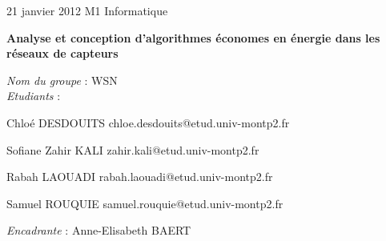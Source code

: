 \documentclass[a4paper]{article}
\begin{document}
\large
\setlength{\parskip}{6mm plus2mm minus2mm}
\setlength{\textwidth}{530pt}
\setlength{\parindent}{0cm}

21 janvier 2012 \hfill M1 Informatique


{\centering \Large \bfseries Analyse et conception d'algorithmes économes en énergie dans les réseaux de capteurs \par}

{\emph{Nom du groupe} : WSN\\ 
\emph{Etudiants} :
\begin{description}
\item Chloé DESDOUITS \hfill chloe.desdouits@etud.univ-montp2.fr
\item Sofiane Zahir KALI \hfill zahir.kali@etud.univ-montp2.fr
\item Rabah LAOUADI \hfill rabah.laouadi@etud.univ-montp2.fr
\item Samuel ROUQUIE \hfill samuel.rouquie@etud.univ-montp2.fr
\end{description}

\emph{Encadrante} : Anne-Elisabeth BAERT
\par}
\end{document}
